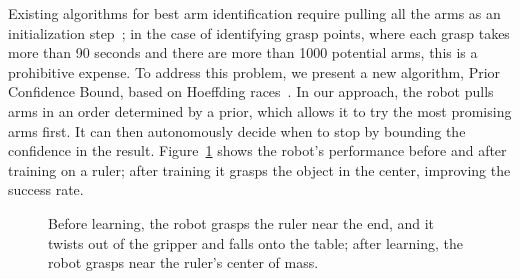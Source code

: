 \documentclass{article}
\newcommand{\algorithmDTxt}{Prior Confidence Bound\xspace}
\begin{document}
Existing algorithms for best arm identification require pulling all
the arms as an initialization step~\citep{mannor04, audibert10,
  chen14}; in the case of identifying grasp points, where each grasp
takes more than 90 seconds and there are more than 1000 potential
arms, this is a prohibitive expense.  To address this problem, we
present a new algorithm, \algorithmDTxt, based on Hoeffding
races~\citep{maron93}. In our approach, the robot pulls arms in an
order determined by a prior, which allows it to try the most promising
arms first. It can then autonomously decide when to stop by bounding
the confidence in the result.  Figure~\ref{fig:ruler} shows the
robot's performance before and after training on a ruler; after
training it grasps the object in the center, improving the success
rate.
\begin{figure}
%
\caption{Before learning, the robot grasps the ruler near the end, and
  it twists out of the gripper and falls onto the table;
  after learning, the robot grasps near the ruler's center of
  mass.\label{fig:ruler}}
\end{figure}
\end{document}

